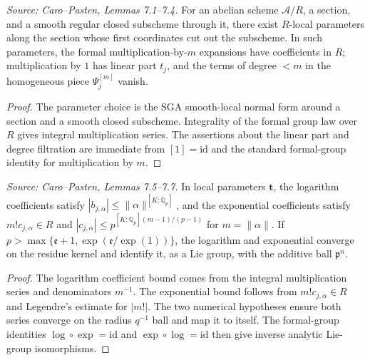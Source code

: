 \begin{lemma}
  \label{lem:cp_logexp_local_parameters}
  \textit{Source: Caro--Pasten, Lemmas 7.1--7.4.}
  For an abelian scheme \(\mathcal A/R\), a section, and a smooth regular
  closed subscheme through it, there exist \(R\)-local parameters along the
  section whose first coordinates cut out the subscheme.  In such parameters,
  the formal multiplication-by-\(m\) expansions have coefficients in \(R\);
  multiplication by \(1\) has linear part \(t_j\), and the terms of degree
  \(<m\) in the homogeneous piece \(\Psi_j^{[m]}\) vanish.
\end{lemma}
\begin{proof}
  The parameter choice is the SGA smooth-local normal form around a section
  and a smooth closed subscheme.  Integrality of the formal group law over
  \(R\) gives integral multiplication series.  The assertions about the linear
  part and degree filtration are immediate from \([1]=\mathrm{id}\) and the
  standard formal-group identity for multiplication by \(m\).
\end{proof}

\begin{lemma}
  \label{lem:cp_logexp_convergence_linearization}
  \textit{Source: Caro--Pasten, Lemmas 7.5--7.7.}
  In local parameters \(\mathbf t\), the logarithm coefficients satisfy
  \(|b_{j,\alpha}|\le\|\alpha\|^{[K:\mathbb Q_p]}\), and the exponential
  coefficients satisfy
  \(m!c_{j,\alpha}\in R\) and
  \(|c_{j,\alpha}|\le p^{[K:\mathbb Q_p](m-1)/(p-1)}\) for
  \(m=\|\alpha\|\).  If
  \(p>\max\{\mathfrak e+1,\exp(\mathfrak e/\exp(1))\}\), the logarithm and
  exponential converge on the residue kernel and identify it, as a Lie group,
  with the additive ball \(\mathfrak p^n\).
\end{lemma}
\begin{proof}
  The logarithm coefficient bound comes from the integral multiplication
  series and denominators \(m^{-1}\).  The exponential bound follows from
  \(m!c_{j,\alpha}\in R\) and Legendre's estimate for \(|m!|\).  The two
  numerical hypotheses ensure both series converge on the radius \(q^{-1}\)
  ball and map it to itself.  The formal-group identities
  \(\log\circ\exp=\mathrm{id}\) and \(\exp\circ\log=\mathrm{id}\) then give
  inverse analytic Lie-group isomorphisms.
\end{proof}

